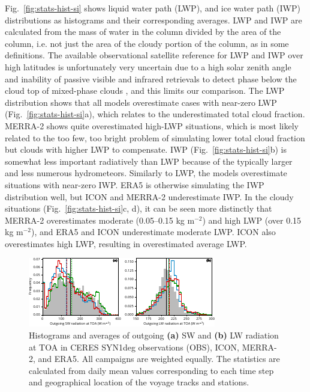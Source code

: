 \documentclass[draft]{agujournal2019}
\begin{document}
Fig.~\ref{fig:stats-hist-si} shows liquid water path (LWP), and ice water path (IWP) distributions as histograms and their corresponding averages. LWP and IWP are calculated from the mass of water in the column divided by the area of the column, i.e. not just the area of the cloudy portion of the column, as in some definitions. The available observational satellite reference for LWP and IWP over high latitudes is unfortunately very uncertain due to a high solar zenith angle and inability of passive visible and infrared retrievals to detect phase below the cloud top of mixed-phase clouds \cite{huang2006,greenwald2009,seethala2010,eliasson2011,duncan2018,khanal2020}, and this limits our comparison. The LWP distribution shows that all models overestimate cases with near-zero LWP (Fig.~\ref{fig:stats-hist-si}a), which relates to the underestimated total cloud fraction. MERRA-2 shows quite overestimated high-LWP situations, which is most likely related to the too few, too bright problem of simulating lower total cloud fraction but clouds with higher LWP to compensate. IWP (Fig.~\ref{fig:stats-hist-si}b) is somewhat less important radiatively than LWP because of the typically larger and less numerous hydrometeors. Similarly to LWP, the models overestimate situations with near-zero IWP. ERA5 is otherwise simulating the IWP distribution well, but ICON and MERRA-2 underestimate IWP. In the cloudy situations (Fig.~\ref{fig:stats-hist-si}c, d), it can be seen more distinctly that MERRA-2 overestimates moderate (0.05--0.15 kg m$^{-2}$) and high LWP (over 0.15 kg m$^{-2}$), and ERA5 and ICON underestimate moderate LWP. ICON also overestimates high LWP, resulting in overestimated average LWP.

\begin{figure}[t]
\centering
\includegraphics[width=\textwidth]{img/stats_hist_rad.pdf}
\caption{
Histograms and averages of outgoing \textbf{(a)} SW and \textbf{(b)} LW radiation at TOA in CERES SYN1deg observations (OBS), ICON, MERRA-2, and ERA5. All campaigns are weighted equally. The statistics are calculated from daily mean values corresponding to each time step and geographical location of the voyage tracks and stations.
}
\label{fig:stats-hist-rad}
\end{figure}
\end{document}
